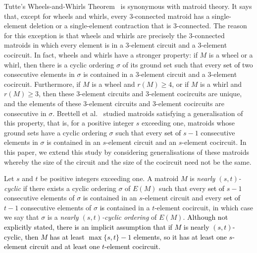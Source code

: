 \documentclass[11pt]{amsart}
\newcommand{\bloo}{\textcolor{black}}
\begin{document}
Tutte's Wheels-and-Whirls Theorem~\cite{tut66} is synonymous with matroid theory. It says that, except for wheels and whirls, every $3$-connected matroid has a single-element deletion or a single-element contraction that is $3$-connected. The reason for this exception is that wheels and whirls are precisely the $3$-connected matroids in which every element is in a $3$-element circuit and a $3$-element cocircuit. In fact, wheels and whirls have a stronger property: if $M$ is a wheel or a whirl, then there is a cyclic ordering $\sigma$ of its ground set such that every \bloo{set of} two consecutive elements in $\sigma$ is contained in a $3$-element circuit and a $3$-element cocircuit. Furthermore, if $M$ is a wheel and $r(M)\ge 4$, or if $M$ is a whirl and $r(M)\ge 3$, then these $3$-element circuits and $3$-element cocircuits are unique, and the elements of these $3$-element circuits and $3$-element cocircuits are consecutive in $\sigma$. Brettell et al.~\cite{bre19b} studied matroids satisfying a generalisation of this property, that is, for a positive integer $s$ exceeding one, matroids whose ground sets have a cyclic ordering $\sigma$ such that every \bloo{set of} $s-1$ consecutive elements in $\sigma$ is contained in an $s$-element circuit and an $s$-element cocircuit. In this paper, we extend this study by considering generalisations of these matroids whereby the size of the circuit and the size of the cocircuit need not be the same.

Let $s$ and $t$ be positive integers exceeding one. A matroid $M$ is {\em nearly $(s, t)$-cyclic} if there exists a cyclic ordering $\sigma$ of $E(M)$ such that every \bloo{set of} $s-1$ consecutive elements of $\sigma$ \bloo{is} contained in an $s$-element circuit and every \bloo{set of} $t-1$ consecutive elements of $\sigma$ \bloo{is} contained in a $t$-element cocircuit, in which case we say that $\sigma$ is a {\em nearly $(s, t)$-cyclic ordering} of $E(M)$. \bloo{Although not explicitly stated, there is an implicit assumption that if $M$ is nearly $(s,t)$-cyclic, then $M$ has at least $\max\{s,t\}-1$ elements, so it has at least one $s$-element circuit and at least one $t$-element cocircuit.}%
\end{document}
